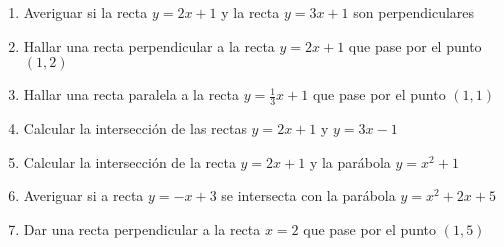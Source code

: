 \documentclass[a4paper]{article}
\begin{document}
\begin{enumerate}
\begin{enumerate} [label=(\alph*)]
		\item Averiguar si la recta $y=2x+1$ y la recta $y=3x+1$ son perpendiculares

		\item Hallar una recta perpendicular a la recta $y=2x+1$ que pase por el punto $(1,2)$

		\item Hallar una recta paralela a la recta $y=\frac{1}{3}x+1$ que pase por el punto $(1,1)$

		\item Calcular la intersección de las rectas $y=2x+1$ y $y=3x-1$

		\item Calcular la intersección de la recta $y=2x+1$ y la parábola $y=x^2+1$

		\item Averiguar si a recta $y=-x+3$ se intersecta con la parábola $y=x^2+2x+5$
	
		\item Dar una recta perpendicular a la recta $x=2$ que pase por el punto $(1,5)$
	\end{enumerate}

\end{enumerate}
\end{document}
